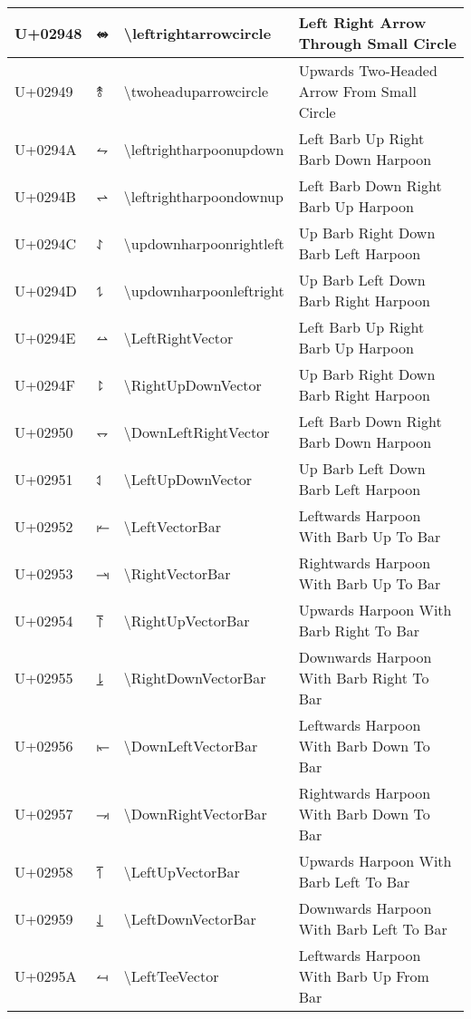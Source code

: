 \begin{table}[h]
\begin{tabulary}{\linewidth}{|L|L|L|L|}
\hline
U+02948 & ⥈ & {\textbackslash}leftrightarrowcircle & Left Right Arrow Through Small Circle \\
\hline
U+02949 & ⥉ & {\textbackslash}twoheaduparrowcircle & Upwards Two-Headed Arrow From Small Circle \\
\hline
U+0294A & ⥊ & {\textbackslash}leftrightharpoonupdown & Left Barb Up Right Barb Down Harpoon \\
\hline
U+0294B & ⥋ & {\textbackslash}leftrightharpoondownup & Left Barb Down Right Barb Up Harpoon \\
\hline
U+0294C & ⥌ & {\textbackslash}updownharpoonrightleft & Up Barb Right Down Barb Left Harpoon \\
\hline
U+0294D & ⥍ & {\textbackslash}updownharpoonleftright & Up Barb Left Down Barb Right Harpoon \\
\hline
U+0294E & ⥎ & {\textbackslash}LeftRightVector & Left Barb Up Right Barb Up Harpoon \\
\hline
U+0294F & ⥏ & {\textbackslash}RightUpDownVector & Up Barb Right Down Barb Right Harpoon \\
\hline
U+02950 & ⥐ & {\textbackslash}DownLeftRightVector & Left Barb Down Right Barb Down Harpoon \\
\hline
U+02951 & ⥑ & {\textbackslash}LeftUpDownVector & Up Barb Left Down Barb Left Harpoon \\
\hline
U+02952 & ⥒ & {\textbackslash}LeftVectorBar & Leftwards Harpoon With Barb Up To Bar \\
\hline
U+02953 & ⥓ & {\textbackslash}RightVectorBar & Rightwards Harpoon With Barb Up To Bar \\
\hline
U+02954 & ⥔ & {\textbackslash}RightUpVectorBar & Upwards Harpoon With Barb Right To Bar \\
\hline
U+02955 & ⥕ & {\textbackslash}RightDownVectorBar & Downwards Harpoon With Barb Right To Bar \\
\hline
U+02956 & ⥖ & {\textbackslash}DownLeftVectorBar & Leftwards Harpoon With Barb Down To Bar \\
\hline
U+02957 & ⥗ & {\textbackslash}DownRightVectorBar & Rightwards Harpoon With Barb Down To Bar \\
\hline
U+02958 & ⥘ & {\textbackslash}LeftUpVectorBar & Upwards Harpoon With Barb Left To Bar \\
\hline
U+02959 & ⥙ & {\textbackslash}LeftDownVectorBar & Downwards Harpoon With Barb Left To Bar \\
\hline
U+0295A & ⥚ & {\textbackslash}LeftTeeVector & Leftwards Harpoon With Barb Up From Bar \\

\end{tabulary}
\end{table}
